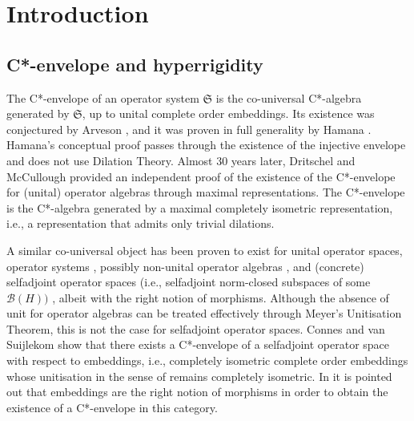 \documentclass[11pt, draft]{amsart}
\numberwithin{equation}{section}
\theoremstyle{plain}
\theoremstyle{definition}
\theoremstyle{remark}
\newcommand{\B}{{\mathcal{B}}}
\newcommand{\fS}{{\mathfrak{S}}}
\begin{document}
\maketitle

\section{Introduction}

\subsection{C*-envelope and hyperrigidity}

The C*-envelope of an operator system $\fS$ is the co-universal C*-algebra generated by $\fS$, up to unital complete order embeddings.
Its existence was conjectured by Arveson \cite{Arv69}, and it was proven in full generality by Hamana \cite{Ham79}.
Hamana's conceptual proof passes through the existence of the injective envelope and does not use Dilation Theory.
Almost 30 years later, Dritschel and McCullough \cite{DM05} provided an independent proof of the existence of the C*-envelope for (unital) operator algebras through maximal representations.
The C*-envelope is the C*-algebra generated by a maximal completely isometric representation, i.e., a representation that admits only trivial dilations.

A similar co-universal object has been proven to exist for unital operator spaces, operator systems \cite{Arv08}, possibly non-unital operator algebras \cite{DS18}, and (concrete) selfadjoint operator spaces (i.e., selfadjoint norm-closed subspaces of some $\B(H))$ \cite{CS21, KKM23}, albeit with the right notion of morphisms.
Although the absence of unit for operator algebras can be treated effectively through Meyer's Unitisation Theorem, this is not the case for selfadjoint operator spaces.
Connes and van Suijlekom \cite[Theorem 2.25]{CS21} show that there exists a C*-envelope of a selfadjoint operator space with respect to embeddings, i.e., completely isometric complete order embeddings whose unitisation in the sense of \cite{Wer02} remains completely isometric. 
In \cite[Remark 2.27]{CS21} it is pointed out that embeddings are the right notion of morphisms in order to obtain the existence of a C*-envelope in this category.
\end{document}
